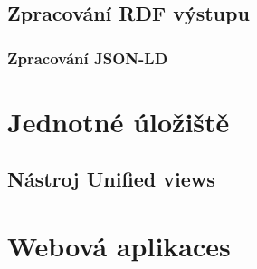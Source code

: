 \subsection{Zpracování RDF výstupu}

\subsubsection{Zpracování JSON-LD}

\section{Jednotné úložiště}

\subsection{Nástroj Unified views}

\section{Webová aplikaces}